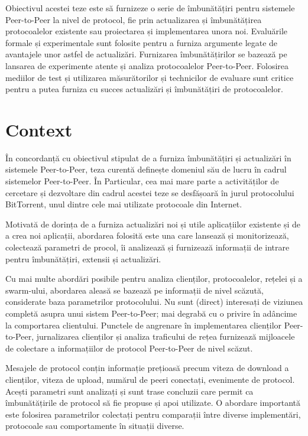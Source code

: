 Obiectivul acestei teze este să furnizeze o serie de îmbunătățiri pentru
sistemele Peer-to-Peer la nivel de protocol, fie prin actualizarea și
îmbunătățirea protocoalelor existente sau proiectarea și implementarea unora
noi. Evaluările formale și experimentale sunt folosite pentru a furniza
argumente legate de avantajele unor astfel de actualizări. Furnizarea
îmbunătățirilor se bazează pe lansarea de experimente atente și analiza
protocoalelor Peer-to-Peer. Folosirea mediilor de test și utilizarea
măsurătorilor și technicilor de evaluare sunt critice pentru a putea furniza
cu succes actualizări și îmbunătățiri de protocoalelor.

\section{Context}
\label{sec:intro:scope}

În concordanță cu obiectivul stipulat de a furniza îmbunătățiri și actualizări
în sistemele Peer-to-Peer, teza curentă definește domeniul său de lucru în
cadrul sistemelor Peer-to-Peer. În Particular, cea mai mare parte a
activităților de cercetare și dezvoltare din cadrul acestei teze se desfășoară
în jurul protocolului BitTorrent, unul dintre cele mai utilizate protocoale
din Internet.

Motivată de dorința de a furniza actualizări noi și utile aplicațiilor
existente și de a crea noi aplicații, abordarea folosită este una care
lansează și monitorizează, colectează parametri de procol, îi analizează și
furnizează informații de intrare pentru îmbunătățiri, extensii și actualizări.

Cu mai multe abordări posibile pentru analiza clienților, protocoalelor,
rețelei și a swarm-ului, abordarea aleasă se bazează pe informații de nivel
scăzută, considerate baza parametrilor protocolului. Nu sunt (direct)
interesați de viziunea completă asupra unui sistem Peer-to-Peer; mai degrabă
cu o privire în adâncime la comportarea clientului. Punctele de angrenare în
implementarea clienților Peer-to-Peer, jurnalizarea clienților și analiza
traficului de rețea furnizează mijloacele de colectare a informațiilor de
protocol Peer-to-Peer de nivel scăzut.

Mesajele de protocol conțin informație prețioasă precum viteza de download a
clienților, viteza de upload, numărul de peeri conectați, evenimente de
protocol. Acești parametri sunt analizați și sunt trase concluzii care permit
ca îmbunătățirile de protocol să fie propuse și apoi utilizate. O abordare
importantă este folosirea parametrilor colectați pentru comparații între
diverse implementări, protocoale sau comportamente în situații diverse.

